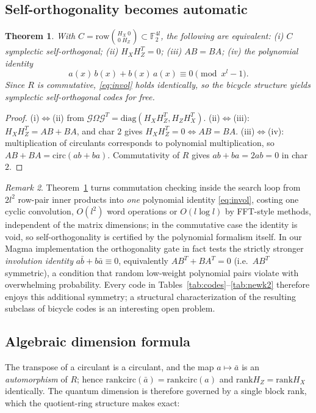 \documentclass[journal,onecolumn]{IEEEtran}
\newtheorem{theorem}{Theorem}
\theoremstyle{definition}
\theoremstyle{remark}
\newtheorem{remark}[theorem]{Remark}
\newcommand{\F}{\mathbb{F}}
\newcommand{\rank}{\mathrm{rank}}
\newcommand{\row}{\mathrm{row}}
\newcommand{\invol}[1]{\bar{#1}}
\begin{document}
\subsection{Self-orthogonality becomes automatic}
\begin{theorem}\label{thm:weld}
With $C=\row\binom{H_X\ 0}{0\ H_Z}\subset\F_2^{4l}$, the following are
equivalent: (i) $C$ symplectic self-orthogonal; (ii) $H_XH_Z^{T}=0$;
(iii) $AB=BA$; (iv) the polynomial identity
\begin{equation}\label{eq:invol}
a(x)\,b(x)+b(x)\,a(x)\equiv 0 \pmod{x^{l}-1}.
\end{equation}
Since $R$ is commutative, \eqref{eq:invol} holds identically, so the bicycle
structure yields symplectic self-orthogonal codes \emph{for free}.
\end{theorem}
\begin{proof}
(i)$\Leftrightarrow$(ii) from
$\mathcal G\Omega\mathcal G^{T}=\mathrm{diag}(H_XH_Z^{T},H_ZH_X^{T})$.
(ii)$\Leftrightarrow$(iii): $H_XH_Z^{T}=AB+BA$, and char $2$ gives
$H_XH_Z^{T}=0\iff AB=BA$.
(iii)$\Leftrightarrow$(iv): multiplication of circulants corresponds to
polynomial multiplication, so
$AB+BA=\mathrm{circ}(ab+ba)$.
Commutativity of $R$ gives $ab+ba=2ab=0$ in char $2$.
\end{proof}

\begin{remark}\label{rem:cheaporth}
Theorem~\ref{thm:weld} turns commutation checking inside the search loop
from $2l^{2}$ row-pair inner products into \emph{one} polynomial identity
\eqref{eq:invol}, costing one cyclic convolution, $O(l^{2})$ word operations
or $O(l\log l)$ by FFT-style methods, independent of the matrix dimensions;
in the commutative case the identity is void, so self-orthogonality is
certified by the polynomial formalism itself. In our Magma implementation
the orthogonality gate in fact tests the strictly stronger \emph{involution
identity} $a\invol{b}+b\invol{a}\equiv0$, equivalently $AB^{T}+BA^{T}=0$
(i.e.\ $AB^{T}$ symmetric), a condition that random low-weight polynomial
pairs violate with overwhelming probability. Every code in
Tables~\ref{tab:codes}--\ref{tab:newk2} therefore enjoys this additional
symmetry; a structural characterization of the resulting subclass of
bicycle codes is an interesting open problem.
\end{remark}

\subsection{Algebraic dimension formula}
The transpose of a circulant is a circulant, and the map
$a\mapsto\invol{a}$ is an \emph{automorphism} of $R$; hence
$\rank\mathrm{circ}(\invol{a})=\rank\mathrm{circ}(a)$ and
$\rank H_Z=\rank H_X$ identically. The quantum dimension is therefore
governed by a single block rank, which the quotient-ring structure makes
exact:
\end{document}

